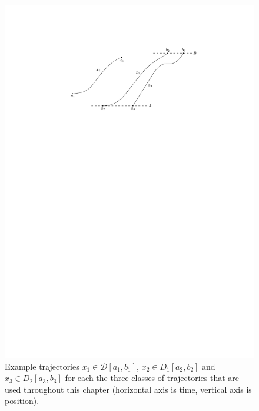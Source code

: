 \documentclass[a4paper]{report}
\theoremstyle{definition}
\theoremstyle{plain}
\begin{document}
\begin{figure}
  \centering
  \includegraphics[scale=0.9]{figures/motion/trajectories}
  \caption{Example trajectories $x_{1} \in \mathcal{D}[a_{1},b_{1}]$,
    $x_{2} \in D_{1}[a_{2},b_{2}]$ and $x_{3} \in D_{2}[a_{3},b_{3}]$ for each
    the three classes of trajectories that are used throughout this chapter
    (horizontal axis is time, vertical axis is position).}%
  \label{fig:trajectories}
\end{figure}
\end{document}

